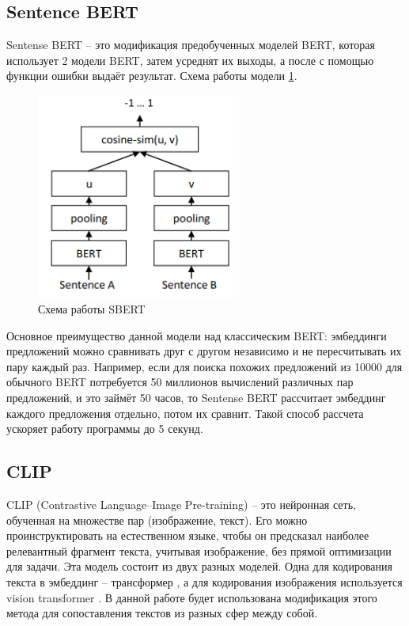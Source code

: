 \documentclass[PI, VKR]{HSEUniversity}
\begin{document}
\subsection{Sentence BERT}
\label{sec:org86b26c2}
Sentense BERT \autocite{reimers-2019-sentence-bert} -- это модификация предобученных моделей BERT, которая использует 2 модели BERT, затем усреднят их выходы, а после с помощью функции ошибки выдаёт результат. Схема работы модели \ref{fig:sbert}.
\begin{figure}[hbp]
\centering
\includegraphics[width=0.6\textwidth]{img/sbert.png}
\caption{\label{fig:sbert}Схема работы SBERT}
\end{figure}
Основное преимущество данной модели над классическим BERT: эмбеддинги предложений можно сравнивать друг с другом независимо и не пересчитывать их пару каждый раз. Например, если для поиска похожих предложений из 10000 для обычного BERT потребуется 50 миллионов вычислений различных пар предложений, и это займёт 50 часов, то Sentense BERT рассчитает эмбеддинг каждого предложения отдельно, потом их сравнит. Такой способ рассчета ускоряет работу программы до 5 секунд.
\subsection{CLIP}
\label{sec:orgc029ed1}
CLIP (Contrastive Language–Image Pre-training)\autocite{radford2021learning} -- это нейронная сеть, обученная на множестве пар (изображение, текст). Его можно проинструктировать на естественном языке, чтобы он предсказал наиболее релевантный фрагмент текста, учитывая изображение, без прямой оптимизации для задачи. Эта модель состоит из двух разных моделей. Одна для кодирования текста в эмбеддинг -- трансформер \autocite{NIPS2017_3f5ee243}, а для кодирования изображения используется vision transformer \autocite{dosovitskiy2020image}. В данной работе будет использована модификация этого метода для сопоставления текстов из разных сфер между собой.
\end{document}
